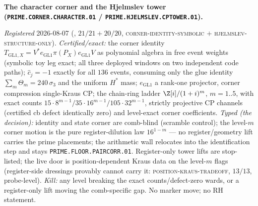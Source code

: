 \par\smallskip\noindent\textbf{The character corner and the
Hjelmslev tower (\texttt{PRIME.CORNER.CHARACTER.01} /
\texttt{PRIME.HJELMSLEV.CPTOWER.01}).}
{\sloppy
\emph{Registered} 2026-08-07
(, $21/21 + 20/20$,
\textsc{corner-identity-symbolic} $+$
\textsc{hjelmslev-structure-only}).  \emph{Certified/exact:} the
corner identity $T_{\mathrm{GL1},X} = V^* e_{\mathrm{GL1}}
\pi(P_X) e_{\mathrm{GL1}} V$ as polynomial algebra in free event
weights (symbolic toy leg exact; all three deployed windows on
two independent code paths); $\hat c_j = -1$ exactly for all
$136$ events, consuming only the glue identity
$\sum_m \Theta_m = 240\,\sigma_3$ and the uniform $H^*$ mass;
$e_{\mathrm{GL1}}$ a rank-one projector, corner compression
single-Kraus CP; the chain-ring ladder $\Z[i]/(1+i)^m$, $m=1..5$,
with exact counts $15\cdot8^{m-1}/35\cdot16^{m-1}/105\cdot
32^{m-1}$, strictly projective CP channels (certified cb defect
identically zero) and level-exact corner coefficients.
\emph{Typed (the decision):} identity and state corner are
comb-blind (scramble control); the level-$m$ corner motion is the
pure register-dilution law $16^{1-m}$ --- no register/geometry
lift carries the prime placements; the arithmetic wall relocates
into the identification step and stays
\texttt{PRIME.FLOOR.PAIRCORR.01}.  Register-only tower lifts are
stop-listed; the live door is position-dependent Kraus data on
the level-$m$ flags (register-side dressings provably cannot
carry it: \textsc{position-kraus-tradeoff}, $13/13$,
probe-level).  \emph{Kill:} any level breaking the exact
counts/defect-zero wards, or a register-only lift moving the
comb-specific gap.  No marker move; no RH statement.\par}


